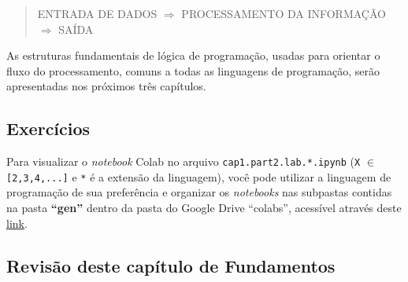 \documentclass[12pt,a4paper]{article}
\begin{document}
\begin{quote}
ENTRADA DE DADOS \(\Rightarrow\) PROCESSAMENTO DA INFORMAÇÃO
\(\Rightarrow\) SAÍDA
\end{quote}

    As estruturas fundamentais de lógica de programação, usadas para
orientar o fluxo do processamento, comuns a todas as linguagens de
programação, serão apresentadas nos próximos três capítulos.

    \hypertarget{exercuxedcios}{%
\subsection{Exercícios}\label{exercuxedcios}}

    Para visualizar o \emph{notebook} Colab no arquivo
\texttt{cap1.part2.lab.*.ipynb} (\texttt{X} \(\in\)
\texttt{{[}2,3,4,...{]}} e \texttt{*} é a extensão da linguagem), você
pode utilizar a linguagem de programação de sua preferência e organizar
os \emph{notebooks} nas subpastas contidas na pasta \textbf{``gen''}
dentro da pasta do Google Drive ``colabs'', acessível através deste
\href{https://drive.google.com/drive/folders/1YlFwv8XYN7PYYf-HwDMlkxzbmXzJw9cM?usp=sharing}{link}.

    \hypertarget{revisuxe3o-deste-capuxedtulo-de-fundamentos}{%
\subsection{Revisão deste capítulo de
Fundamentos}\label{revisuxe3o-deste-capuxedtulo-de-fundamentos}}
\end{document}
